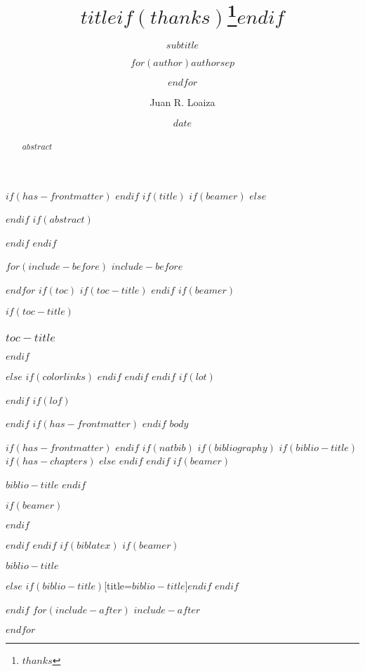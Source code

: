 \documentclass[
$if(fontsize)$$fontsize$, $else$9pt, $endif$
$if(lang)$
  $babel-lang$, 
$endif$
$if(papersize)$
  $papersize$paper, 
$endif$
$if(beamer)$
  ignorenonframetext,
$if(handout)$
  handout,
$endif$
$if(aspectratio)$
  aspectratio=$aspectratio$,
$endif$
$endif$
$for(classoption)$
$classoption$$sep$,
$endfor$
]{$documentclass$}
\title{$title$$if(thanks)$\thanks{$thanks$}$endif$}
\subtitle{$subtitle$}
\author{$for(author)$$author$$sep$ \and $endfor$}
\author{Juan R. Loaiza}
\date{$date$}
\institute{$for(institute)$$institute$$sep$ \and $endfor$}
\institute{Departamento de Filosofía · Universidad Alberto Hurtado}
\newif\ifbibliography
\begin{document}
$if(has-frontmatter)$
\frontmatter
$endif$
$if(title)$
$if(beamer)$
\frame{\titlepage}
$else$
\maketitle
$endif$
$if(abstract)$
\begin{abstract}
  $abstract$
\end{abstract}
$endif$
$endif$

$for(include-before)$
$include-before$

$endfor$
$if(toc)$
$if(toc-title)$
\renewcommand*\contentsname{$toc-title$}
$endif$
$if(beamer)$
\begin{frame}
  $if(toc-title)$
  \frametitle{$toc-title$}
  $endif$
  \tableofcontents[hideallsubsections]
\end{frame}
$else$
{
    $if(colorlinks)$
    \hypersetup{linkcolor=$if(toccolor)$$toccolor$$else$$endif$}
    $endif$
    \setcounter{tocdepth}{$toc-depth$}
    \tableofcontents
  }
$endif$
$endif$
$if(lot)$
\listoftables
$endif$
$if(lof)$
\listoffigures
$endif$
$if(has-frontmatter)$
\mainmatter
$endif$
$body$

$if(has-frontmatter)$
\backmatter
$endif$
$if(natbib)$
$if(bibliography)$
$if(biblio-title)$
$if(has-chapters)$
\renewcommand\bibname{$biblio-title$}
$else$
\renewcommand\refname{$biblio-title$}
$endif$
$endif$
$if(beamer)$
\begin{frame}[allowframebreaks]{$biblio-title$}
  \bibliographytrue
  $endif$
  
  $if(beamer)$
\end{frame}
$endif$

$endif$
$endif$
$if(biblatex)$
$if(beamer)$
\begin{frame}[allowframebreaks]{$biblio-title$}
  \bibliographytrue
  \printbibliography[heading=none]
\end{frame}
$else$
\printbibliography$if(biblio-title)$[title=$biblio-title$]$endif$
$endif$

$endif$
$for(include-after)$
$include-after$

$endfor$
\end{document}
